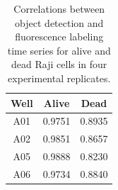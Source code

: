 \begin{table}[h]
\begin{center}
\begin{tabular}{|c|c|c|}
\hline
Well & Alive & Dead \\
\hline
A01 & 0.9751 & 0.8935\\
A02 & 0.9851 & 0.8657\\
A05 & 0.9888 & 0.8230\\
A06 & 0.9734 & 0.8840\\
\hline
\end{tabular}
\end{center}
\caption{Correlations between object detection and fluorescence labeling time series for alive and dead Raji cells in four experimental replicates.}
\label{table:correlations}
\end{table}
